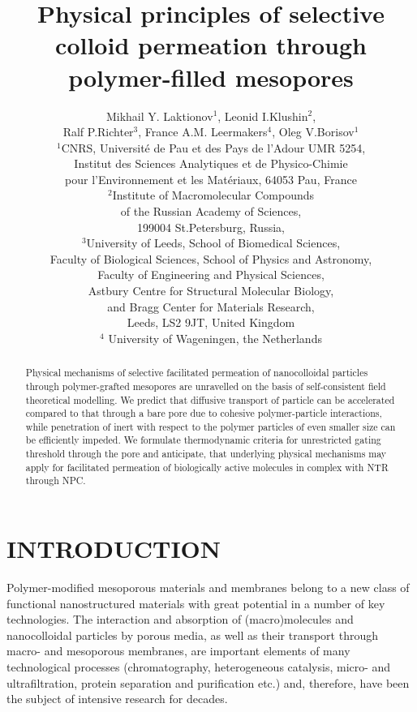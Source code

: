 \documentclass[12pt, a4paper]{article}
\title{Physical principles of selective colloid permeation through polymer-filled mesopores}
\author{Mikhail Y. Laktionov$^1$, Leonid I.Klushin$^{2}$,\\Ralf P.Richter$^3$, France A.M. Leermakers$^4$, Oleg V.Borisov$^1$\\
$^{1}$CNRS, Universit\'e de Pau et des Pays de l'Adour UMR 5254,\\
Institut des Sciences Analytiques et de Physico-Chimie\\
pour l'Environnement et les Mat\'eriaux, 64053 Pau, France \\
$^{2}$Institute of Macromolecular Compounds \\
of the Russian Academy of Sciences, \\
199004 St.Petersburg, Russia,\\
$^{3}$University of Leeds, School of Biomedical Sciences, \\
Faculty of Biological Sciences, 
School of Physics and Astronomy, \\
Faculty of Engineering and Physical Sciences,\\  
Astbury Centre for Structural Molecular Biology,\\ 
and Bragg Center for Materials Research,\\ 
Leeds, LS2 9JT, United Kingdom\\
$^{4}$ University of Wageningen, the Netherlands
}
\date{}
\begin{document}
\maketitle

\begin{abstract}


Physical mechanisms of selective facilitated permeation of nanocolloidal particles 
through polymer-grafted mesopores are unravelled on the basis of self-consistent field theoretical modelling.
We predict that diffusive transport of particle can be accelerated compared to that through a bare pore due to
cohesive polymer-particle interactions, while penetration of inert with respect to the polymer particles of even smaller size can be 
efficiently impeded. We formulate thermodynamic criteria for unrestricted gating threshold through the pore and anticipate, that underlying
physical mechanisms may apply for facilitated permeation of biologically active molecules in complex with NTR through NPC.   
\end{abstract}

\section{INTRODUCTION}


Polymer-modified mesoporous materials and membranes belong to a new class of functional nanostructured materials with great potential in a number of key technologies. 
The interaction and absorption of (macro)molecules and nanocolloidal particles by porous media, as well as their transport through macro- and mesoporous membranes, 
are important elements of many technological processes (chromatography, heterogeneous catalysis, micro- and ultrafiltration, protein separation and purification etc.) 
and, therefore, have been the subject of intensive research for decades. 
\end{document}
